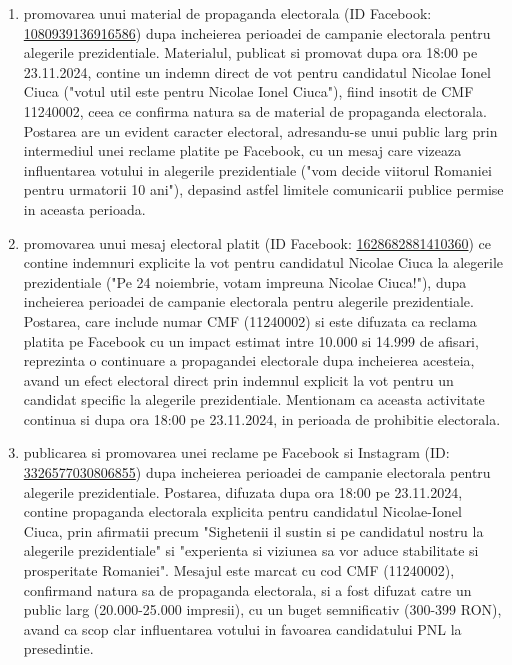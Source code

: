 \documentclass[a4paper,12pt]{article}
\begin{document}
\begin{enumerate}[leftmargin=*, label=\arabic*.)]
    \item promovarea unui material de propaganda electorala (ID Facebook: \href{https://www.facebook.com/ads/library/?id=1080939136916586}{1080939136916586}) dupa incheierea perioadei de campanie electorala pentru alegerile prezidentiale. Materialul, publicat si promovat dupa ora 18:00 pe 23.11.2024, contine un indemn direct de vot pentru candidatul Nicolae Ionel Ciuca ("votul util este pentru Nicolae Ionel Ciuca"), fiind insotit de CMF 11240002, ceea ce confirma natura sa de material de propaganda electorala. Postarea are un evident caracter electoral, adresandu-se unui public larg prin intermediul unei reclame platite pe Facebook, cu un mesaj care vizeaza influentarea votului in alegerile prezidentiale ("vom decide viitorul Romaniei pentru urmatorii 10 ani"), depasind astfel limitele comunicarii publice permise in aceasta perioada.
    \item promovarea unui mesaj electoral platit (ID Facebook: \href{https://www.facebook.com/ads/library/?id=1628682881410360}{1628682881410360}) ce contine indemnuri explicite la vot pentru candidatul Nicolae Ciuca la alegerile prezidentiale ("Pe 24 noiembrie, votam impreuna Nicolae Ciuca!"), dupa incheierea perioadei de campanie electorala pentru alegerile prezidentiale. Postarea, care include numar CMF (11240002) si este difuzata ca reclama platita pe Facebook cu un impact estimat intre 10.000 si 14.999 de afisari, reprezinta o continuare a propagandei electorale dupa incheierea acesteia, avand un efect electoral direct prin indemnul explicit la vot pentru un candidat specific la alegerile prezidentiale. Mentionam ca aceasta activitate continua si dupa ora 18:00 pe 23.11.2024, in perioada de prohibitie electorala.
    \item publicarea si promovarea unei reclame pe Facebook si Instagram (ID: \href{https://www.facebook.com/ads/library/?id=3326577030806855}{3326577030806855}) dupa incheierea perioadei de campanie electorala pentru alegerile prezidentiale. Postarea, difuzata dupa ora 18:00 pe 23.11.2024, contine propaganda electorala explicita pentru candidatul Nicolae-Ionel Ciuca, prin afirmatii precum "Sighetenii il sustin si pe candidatul nostru la alegerile prezidentiale" si "experienta si viziunea sa vor aduce stabilitate si prosperitate Romaniei". Mesajul este marcat cu cod CMF (11240002), confirmand natura sa de propaganda electorala, si a fost difuzat catre un public larg (20.000-25.000 impresii), cu un buget semnificativ (300-399 RON), avand ca scop clar influentarea votului in favoarea candidatului PNL la presedintie.

\end{enumerate}
\end{document}
